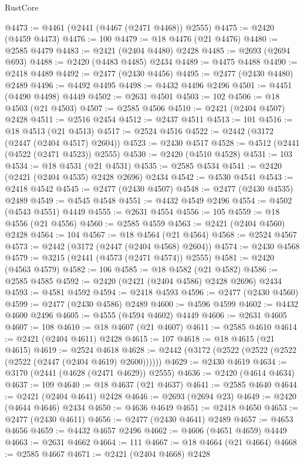 \begin{lexlean}{RustCore}
\begin{coremodule}
@4473 := @4461 (@2441 (@4467 (@2471 @4468)) @2555)
@4475 := @2420 (@4459 @4473)
@4476 := 100
@4479 := @18 @4476 (@21 @4476)
@4480 := @2585 @4479
@4483 := @2421 (@2404 @4480) @2428
@4485 := @2693 (@2694 @693)
@4488 := @2420 (@4483 @4485) @2434
@4489 := @4475 @4488
@4490 := @2418 @4489
@4492 := @2477 (@2430 @4456)
@4495 := @2477 (@2430 @4480) @2489
@4496 := @4492 @4495
@4498 := @4432 @4496 @2496
@4501 := @4451 (@4490 @4498) @4449
@4502 := @2631 @4501
@4503 := 102
@4506 := @18 @4503 (@21 @4503)
@4507 := @2585 @4506
@4510 := @2421 (@2404 @4507) @2428
@4511 := @2516 @2454
@4512 := @2437 @4511
@4513 := 101
@4516 := @18 @4513 (@21 @4513)
@4517 := @2524 @4516
@4522 := @2442 (@3172 (@2447 (@2404 @4517) @2604))
@4523 := @2430 @4517
@4528 := @4512 (@2441 (@4522 (@2471 @4523)) @2555)
@4530 := @2420 (@4510 @4528)
@4531 := 103
@4534 := @18 @4531 (@21 @4531)
@4535 := @2585 @4534
@4541 := @2420 (@2421 (@2404 @4535) @2428 @2696) @2434
@4542 := @4530 @4541
@4543 := @2418 @4542
@4545 := @2477 (@2430 @4507)
@4548 := @2477 (@2430 @4535) @2489
@4549 := @4545 @4548
@4551 := @4432 @4549 @2496
@4554 := @4502 (@4543 @4551) @4449
@4555 := @2631 @4554
@4556 := 105
@4559 := @18 @4556 (@21 @4556)
@4560 := @2585 @4559
@4563 := @2421 (@2404 @4560) @2428
@4564 := 104
@4567 := @18 @4564 (@21 @4564)
@4568 := @2524 @4567
@4573 := @2442 (@3172 (@2447 (@2404 @4568) @2604))
@4574 := @2430 @4568
@4579 := @3215 (@2441 (@4573 (@2471 @4574)) @2555)
@4581 := @2420 (@4563 @4579)
@4582 := 106
@4585 := @18 @4582 (@21 @4582)
@4586 := @2585 @4585
@4592 := @2420 (@2421 (@2404 @4586) @2428 @2696) @2434
@4593 := @4581 @4592
@4594 := @2418 @4593
@4596 := @2477 (@2430 @4560)
@4599 := @2477 (@2430 @4586) @2489
@4600 := @4596 @4599
@4602 := @4432 @4600 @2496
@4605 := @4555 (@4594 @4602) @4449
@4606 := @2631 @4605
@4607 := 108
@4610 := @18 @4607 (@21 @4607)
@4611 := @2585 @4610
@4614 := @2421 (@2404 @4611) @2428
@4615 := 107
@4618 := @18 @4615 (@21 @4615)
@4619 := @2524 @4618
@4628 := @2442 (@3172 (@2522 (@2522 (@2522 (@2522 (@2447 (@2404 @4619) @2600))))))
@4629 := @2430 @4619
@4634 := @3170 (@2441 (@4628 (@2471 @4629)) @2555)
@4636 := @2420 (@4614 @4634)
@4637 := 109
@4640 := @18 @4637 (@21 @4637)
@4641 := @2585 @4640
@4644 := @2421 (@2404 @4641) @2428
@4646 := @2693 (@2694 @23)
@4649 := @2420 (@4644 @4646) @2434
@4650 := @4636 @4649
@4651 := @2418 @4650
@4653 := @2477 (@2430 @4611)
@4656 := @2477 (@2430 @4641) @2489
@4657 := @4653 @4656
@4659 := @4432 @4657 @2496
@4662 := @4606 (@4651 @4659) @4449
@4663 := @2631 @4662
@4664 := 111
@4667 := @18 @4664 (@21 @4664)
@4668 := @2585 @4667
@4671 := @2421 (@2404 @4668) @2428

\end{coremodule}
\end{lexlean}
